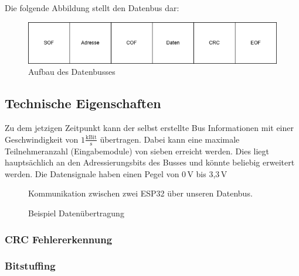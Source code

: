 Die folgende Abbildung stellt den Datenbus dar:
\begin{figure}[H]
	\centering    
	\includegraphics[width=1\textwidth]{Bilder/datenbus.png}
	\caption{Aufbau des Datenbusses}
	\label{Datenbus}
\end{figure}

\subsection{Technische Eigenschaften}
Zu dem jetzigen Zeitpunkt kann der selbst erstellte Bus Informationen mit einer Geschwindigkeit von $1\frac{\mathrm{kBit}}{\mathrm{s}}$ übertragen. Dabei kann eine maximale Teilnehmeranzahl (Eingabemodule) von sieben erreicht werden. Dies liegt hauptsächlich an den Adressierungsbits des Busses und könnte beliebig erweitert werden. Die Datensignale haben einen Pegel von 0\,\si{V} bis 3,3\,\si{V}

\begin{figure}[H]
    \centering    
    \caption{Kommunikation zwischen zwei ESP32 über unseren Datenbus.}
    \label{zeitplan}
\end{figure}

\begin{figure}[H]
    \centering    
    \caption{Beispiel Datenübertragung}
    \label{beispielDatenübertragung}
\end{figure}

\subsubsection{CRC Fehlererkennung}

\subsubsection{Bitstuffing}